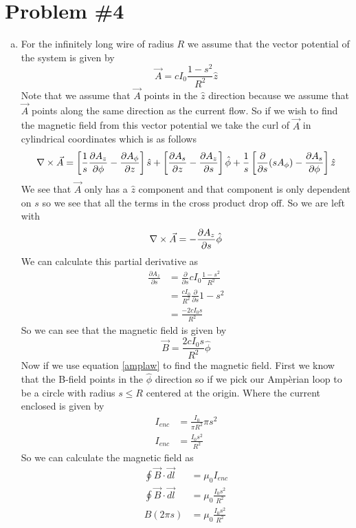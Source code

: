 \documentclass[11pt]{article}
\numberwithin{equation}{section}
\newcommand{\grad}{\bold\nabla}
\begin{document}
\section{Problem \#4}
\begin{enumerate}[(a)]
\item
For the infinitely long wire of radius $R$ we assume that the vector potential of the system is given by 
$$\vec{A} = cI_0\frac{1-s^2}{R^2}\hat{z}$$
Note that we assume that $\vec{A}$ points in the $\hat{z}$ direction because we assume that $\vec{A}$ points along the same direction as the current flow. So if we wish to find the magnetic field from this vector potential we take the curl of $\vec{A}$ in cylindrical coordinates which is as follows
$$\grad\times\vec{A} = \left[\frac{1}{s}\frac{\partial A_z}{\partial\phi}-\frac{\partial A_{\phi}}{\partial z}\right]\hat{s}+\left[\frac{\partial A_s}{\partial z}-\frac{\partial A_z}{\partial s}\right]\hat{\phi}+\frac{1}{s}\left[\frac{\partial}{\partial s}(sA_{\phi})-\frac{\partial A_s}{\partial\phi}\right]\hat{z}$$
We see that $\vec{A}$ only has a $\hat{z}$ component and that component is only dependent on $s$ so we see that all the terms in the cross product drop off. So we are left with
$$\grad\times\vec{A} = -\frac{\partial A_z}{\partial s}\hat{\phi}$$
We can calculate this partial derivative as
\begin{align*}
\frac{\partial A_z}{\partial s} &= \frac{\partial}{\partial s}cI_0\frac{1-s^2}{R^2}\\
&= \frac{cI_0}{R^2}\frac{\partial}{\partial s}1-s^2\\
&= \frac{-2cI_0s}{R^2}
\end{align*}
So we can see that the magnetic field is given by 
$$\vec{B} = \frac{2cI_0s}{R^2}\hat{\phi}$$
Now if we use equation \ref{amplaw} to find the magnetic field. First we know that the B-field points in the $\hat{\phi}$ direction so if we pick our Amp\`{e}rian loop to be a circle with radius $s\le R$ centered at the origin. Where the current enclosed is given by 
\begin{align*}
I_{enc} &= \frac{I_0}{\pi R^2}\pi s^2\\
I_{enc} &= \frac{I_0s^2}{R^2}
\end{align*}
So we can calculate the magnetic field as
\begin{align*}
\oint\vec{B}\cdot\vec{dl} &= \mu_0I_{enc}\\
\oint\vec{B}\cdot\vec{dl} &= \mu_0\frac{I_0s^2}{R^2}\\
B(2\pi s) &= \mu_0\frac{I_0s^2}{R^2}\\

\end{align*}
\end{enumerate}
\end{document}
